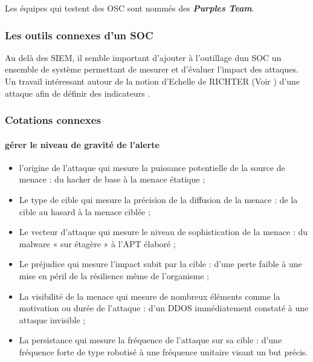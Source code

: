 Les équipes qui testent des OSC sont nommés des \textbf{\textit{Purples Team}}.

\subsubsection{Les outils connexes d'un SOC}

Au delà des SIEM, il semble important d'ajouter à l'outillage dun SOC un ensemble de système permettant de mesurer et d'évaluer l'impact des attaques. Un travail intéressant autour de la notion d'Echelle de RICHTER (Voir  ) d'une attaque afin de définir des indicateurs .

\begin{frame}
\frametitle<presentation>{Cotations connexes	}
\framesubtitle<presentation>{gérer le niveau de gravité de l'alerte}
\begin{itemize}
  \item l’origine de l’attaque qui mesure la puissance potentielle de la source de menace : du hacker de base à la menace étatique ;
  \item Le type de cible qui mesure la précision de la diffusion de la menace : de la cible au hasard à la menace ciblée ;
  \item Le vecteur d’attaque qui mesure le niveau de sophistication de la menace : du malware « sur étagère » à l’APT élaboré ;
   \item Le préjudice qui mesure l’impact subit par la cible : d’une perte faible à une mise en péril de la résilience même de l’organisme ;
  \item La visibilité de la menace qui mesure de nombreux éléments comme la motivation ou durée de l’attaque : d’un DDOS immédiatement constaté à une attaque invisible ;
  \item La persistance qui mesure la fréquence de l’attaque sur sa cible : d’une fréquence forte de type robotisé à une fréquence unitaire visant un but précis.
\end{itemize}
\end{frame}




